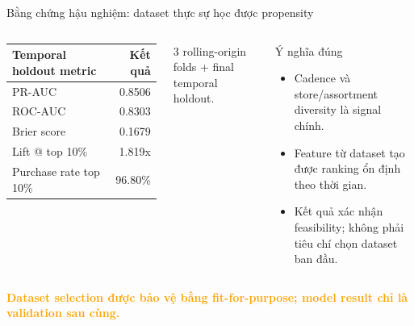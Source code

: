 \documentclass[aspectratio=169,11pt]{beamer}
\begin{document}
\begin{frame}{Bằng chứng hậu nghiệm: dataset thực sự học được propensity}
  \begin{columns}[T,onlytextwidth]
      \begin{tabular}{lr}
        \toprule
        Temporal holdout metric & Kết quả \\
        \midrule
        PR-AUC & 0.8506 \\
        ROC-AUC & 0.8303 \\
        Brier score & 0.1679 \\
        Lift @ top 10\% & 1.819x \\
        Purchase rate top 10\% & 96.80\% \\
        \bottomrule
      \end{tabular}
      \vspace{0.3cm}
      {\small 3 rolling-origin folds + final temporal holdout.}
      \begin{block}{Ý nghĩa đúng}
        \begin{itemize}
          \item Cadence và store/assortment diversity là signal chính.
          \item Feature từ dataset tạo được ranking ổn định theo thời gian.
          \item Kết quả xác nhận feasibility; không phải tiêu chí chọn dataset ban đầu.
        \end{itemize}
      \end{block}
  \end{columns}
  \vspace{0.25cm}
  \begin{center}
    \textcolor{Orange}{\bfseries Dataset selection được bảo vệ bằng fit-for-purpose;
    model result chỉ là validation sau cùng.}
  \end{center}
\end{frame}
\end{document}
